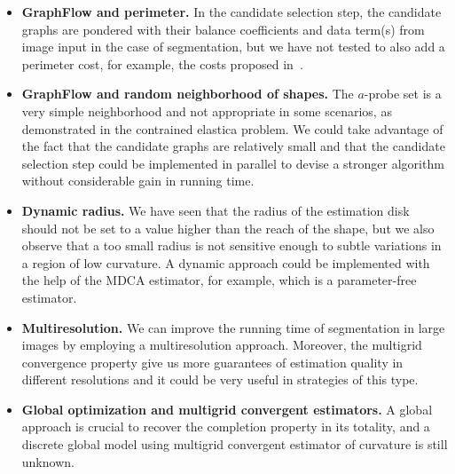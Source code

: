\begin{itemize}
	\item[]{\textbf{GraphFlow and perimeter.} In the candidate selection step, the candidate graphs are pondered with their balance coefficients and data term(s) from image input in the case of segmentation, but we have not tested to also add a perimeter cost, for example, the costs proposed in~\cite{boykov03geodesics}}. 
	\item[]{\textbf{GraphFlow and random neighborhood of shapes.} The $a$-probe set is a very simple neighborhood and not appropriate in some scenarios, as demonstrated in the contrained elastica problem. We could take advantage of the fact that the candidate graphs are relatively small and that the candidate selection step could be implemented in parallel to devise a stronger algorithm without considerable gain in running time.} 
	\item[]{\textbf{Dynamic radius.} We have seen that the radius of the estimation disk should not be set to a value higher than the reach of the shape, but we also observe that a too small radius is not sensitive enough to subtle variations in a region of low curvature. A dynamic approach could be implemented with the help of the MDCA estimator, for example, which is a parameter-free estimator. }
	\item[]{\textbf{Multiresolution.} We can improve the running time of segmentation in large images by employing a multiresolution approach. Moreover, the multigrid convergence property give us more guarantees of estimation quality in different resolutions and it could be very useful in strategies of this type.}
	\item[]{\textbf{Global optimization and multigrid convergent estimators.} A global approach is crucial to recover the completion property in its totality, and a discrete global model using multigrid convergent estimator of curvature is still unknown.}
\end{itemize}
 




